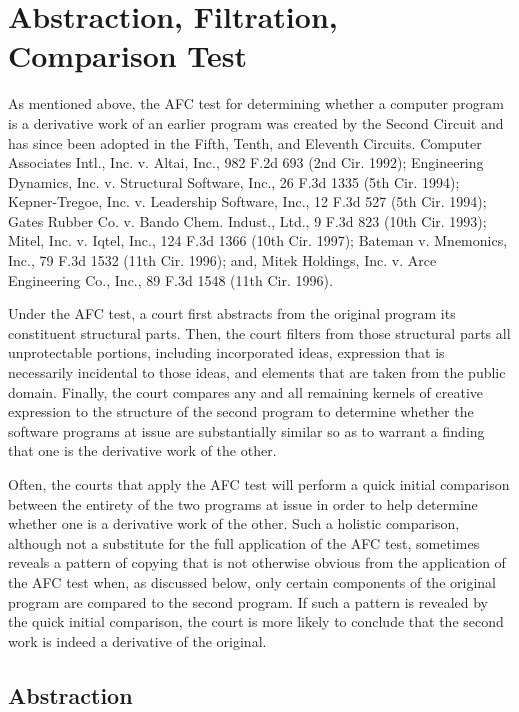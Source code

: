 \section{Abstraction, Filtration, Comparison Test}

As mentioned above, the AFC test for determining whether a computer
program is a derivative work of an earlier program was created by the
Second Circuit and has since been adopted in the Fifth, Tenth, and
Eleventh Circuits. Computer Associates Intl., Inc. v. Altai, Inc., 982
F.2d 693 (2nd Cir. 1992); Engineering Dynamics, Inc. v. Structural
Software, Inc., 26 F.3d 1335 (5th Cir. 1994); Kepner-Tregoe,
Inc. v. Leadership Software, Inc., 12 F.3d 527 (5th Cir. 1994); Gates
Rubber Co. v. Bando Chem. Indust., Ltd., 9 F.3d 823 (10th Cir. 1993);
Mitel, Inc. v. Iqtel, Inc., 124 F.3d 1366 (10th Cir. 1997); Bateman
v. Mnemonics, Inc., 79 F.3d 1532 (11th Cir. 1996); and, Mitek Holdings,
Inc. v. Arce Engineering Co., Inc., 89 F.3d 1548 (11th Cir. 1996).

Under the AFC test, a court first abstracts from the original program its
constituent structural parts. Then, the court filters from those
structural parts all unprotectable portions, including incorporated ideas,
expression that is necessarily incidental to those ideas, and elements
that are taken from the public domain. Finally, the court compares any and
all remaining kernels of creative expression to the structure of the
second program to determine whether the software programs at issue are
substantially similar so as to warrant a finding that one is the
derivative work of the other.

Often, the courts that apply the AFC test will perform a quick initial
comparison between the entirety of the two programs at issue in order to
help determine whether one is a derivative work of the other. Such a
holistic comparison, although not a substitute for the full application of
the AFC test, sometimes reveals a pattern of copying that is not otherwise
obvious from the application of the AFC test when, as discussed below,
only certain components of the original program are compared to the second
program. If such a pattern is revealed by the quick initial comparison,
the court is more likely to conclude that the second work is indeed a
derivative of the original.

\subsection{Abstraction}

